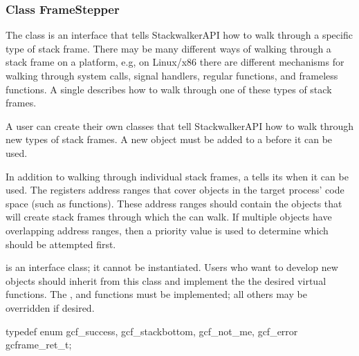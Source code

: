 \subsubsection{Class FrameStepper}
\label{subsec:framestepper}

The  class is an interface that tells StackwalkerAPI how to walk
through a specific type of stack frame. There may be many different ways of
walking through a stack frame on a platform, e.g, on Linux/x86 there are
different mechanisms for walking through system calls, signal handlers, regular
functions, and frameless functions. A single  describes how to walk
through one of these types of stack frames.

A user can create their own  classes that tell StackwalkerAPI how to
walk through new types of stack frames. A new  object must be added
to a  before it can be used.

In addition to walking through individual stack frames, a  tells its
 when it can be used. The  registers address ranges that
cover objects in the target process' code space (such as functions). These
address ranges should contain the objects that will create stack frames through
which the  can walk. If multiple  objects have
overlapping address ranges, then a priority value is used to determine which
 should be attempted first.

 is an interface class; it cannot be instantiated. Users who want to
develop new  objects should inherit from this class and implement
the the desired virtual functions. The , and  functions must be implemented; all
others may be overridden if desired.

\begin{apient}
typedef enum {
    gcf_success,
    gcf_stackbottom,
    gcf_not_me,
    gcf_error
} gcframe_ret_t;
\end{apient}

